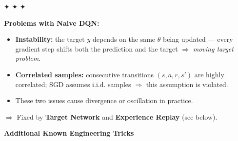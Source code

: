\documentclass[11pt]{article}
\providecommand{\tightlist}{%
      \setlength{\itemsep}{0pt}\setlength{\parskip}{0pt}}
\begin{document}
✦ ✦ ✦

\textbf{Problems with Naive DQN:}

\begin{itemize}
\tightlist
\item
  \textbf{Instability:} the target \(y\) depends on the same \(\theta\)
  being updated --- every gradient step shifts both the prediction and
  the target \(\Rightarrow\) \emph{moving target problem}.
\item
  \textbf{Correlated samples:} consecutive transitions \((s,a,r,s')\)
  are highly correlated; SGD assumes i.i.d. samples \(\Rightarrow\) this
  assumption is violated.
\item
  These two issues cause divergence or oscillation in practice.
\end{itemize}

\(\Rightarrow\) Fixed by \textbf{Target Network} and \textbf{Experience
Replay} (see below).

    \label{tricks-3-1}

    \textbf{Additional Known Engineering Tricks}
\end{document}
